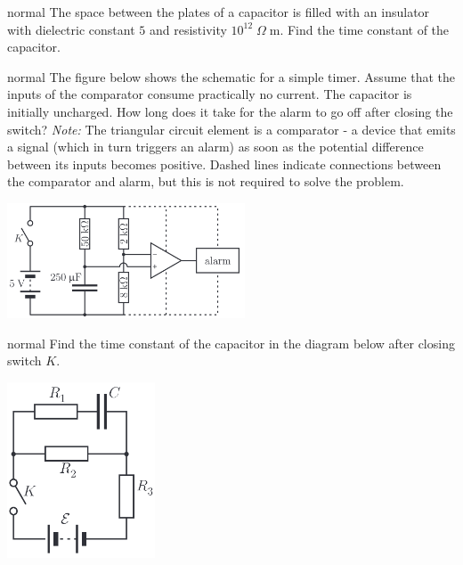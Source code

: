 \hypertarget{P55}{}
\begin{solution}{normal} %
The space between the plates of a capacitor is filled with an insulator with dielectric constant $5$ and resistivity $10^{12}\;\Omega\;\text{m}$. Find the time constant of the capacitor.
\end{solution}

\hypertarget{P56}{}
\begin{solution}{normal} %
The figure below shows the schematic for a simple timer. Assume that the inputs of the comparator consume practically no current. The capacitor is initially uncharged. How long does it take for the alarm to go off after closing the switch? \textit{Note:} The triangular circuit element is a comparator - a device that emits a signal (which in turn triggers an alarm) as soon as the potential difference between its inputs becomes positive. Dashed lines indicate connections between the comparator and alarm, but this is not required to solve the problem.
\begin{center}
    \includegraphics[width=0.53\textwidth]{S2 Figures/S2-56.png}
\end{center}
\end{solution}

\hypertarget{P57}{}
\begin{solution}{normal} %
Find the time constant of the capacitor in the diagram below after closing switch $K$.
\begin{center}
    \includegraphics[width=0.33\textwidth]{S2 Figures/S2-50.png}
\end{center}
\end{solution}

